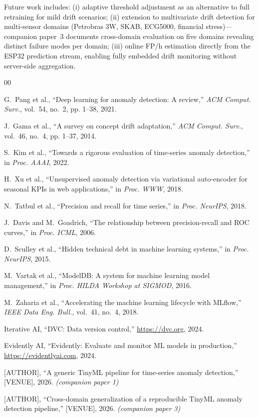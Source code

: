 \documentclass[conference]{IEEEtran}
\begin{document}
Future work includes:
(i) adaptive threshold adjustment as an alternative to full retraining for
    mild drift scenarios;
(ii) extension to multivariate drift detection for multi-sensor domains
    (Petrobras 3W, SKAB, ECG5000, financial stress)---companion paper~3
    documents cross-domain evaluation on five domains revealing distinct
    failure modes per domain;
(iii) online FP/h estimation directly from the ESP32 prediction stream,
    enabling fully embedded drift monitoring without server-side aggregation.


\begin{thebibliography}{00}

G.~Pang et al.,
``Deep learning for anomaly detection: A review,''
\textit{ACM Comput. Surv.}, vol.~54, no.~2, pp. 1--38, 2021.

J.~Gama et al.,
``A survey on concept drift adaptation,''
\textit{ACM Comput. Surv.}, vol.~46, no.~4, pp. 1--37, 2014.

S.~Kim et al.,
``Towards a rigorous evaluation of time-series anomaly detection,''
in \textit{Proc. AAAI}, 2022.

H.~Xu et al.,
``Unsupervised anomaly detection via variational auto-encoder for seasonal
KPIs in web applications,''
in \textit{Proc. WWW}, 2018.

N.~Tatbul et al.,
``Precision and recall for time series,''
in \textit{Proc. NeurIPS}, 2018.

J.~Davis and M.~Goadrich,
``The relationship between precision-recall and ROC curves,''
in \textit{Proc. ICML}, 2006.

D.~Sculley et al.,
``Hidden technical debt in machine learning systems,''
in \textit{Proc. NeurIPS}, 2015.

M.~Vartak et al.,
``ModelDB: A system for machine learning model management,''
in \textit{Proc. HILDA Workshop at SIGMOD}, 2016.

M.~Zaharia et al.,
``Accelerating the machine learning lifecycle with MLflow,''
\textit{IEEE Data Eng. Bull.}, vol.~41, no.~4, 2018.

{Iterative AI},
``DVC: Data version control,''
\url{https://dvc.org}, 2024.

{Evidently AI},
``Evidently: Evaluate and monitor ML models in production,''
\url{https://evidentlyai.com}, 2024.

[AUTHOR],
``A generic TinyML pipeline for time-series anomaly detection,''
[VENUE], 2026. \textit{(companion paper 1)}

[AUTHOR],
``Cross-domain generalization of a reproducible TinyML anomaly detection pipeline,''
[VENUE], 2026. \textit{(companion paper 3)}

\end{thebibliography}
\end{document}
